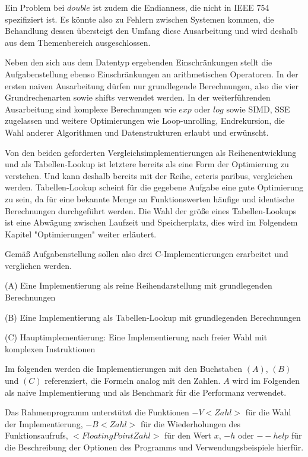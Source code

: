 \documentclass[course=erap]{aspdoc}
\begin{document}
    Ein Problem bei $double$ ist zudem die Endianness, die nicht in IEEE 754~\cite{StandardforBinaryFloating-PointArithmetic} spezifiziert ist.
    Es könnte also zu Fehlern zwischen Systemen kommen, die Behandlung dessen übersteigt den Umfang diese Ausarbeitung und wird deshalb aus dem Themenbereich ausgeschlossen.


    Neben den sich aus dem Datentyp ergebenden Einschränkungen stellt die Aufgabenstellung ebenso Einschränkungen an arithmetischen Operatoren.
    In der ersten naiven Ausarbeitung dürfen nur grundlegende Berechnungen, also die vier Grundrechenarten sowie shifts verwendet werden.
    In der weiterführenden Ausarbeitung sind komplexe Berechnungen wie $exp$ oder $log$ sowie SIMD, SSE zugelassen und weitere Optimierungen wie Loop-unrolling, Endrekursion, die Wahl anderer Algorithmen und Datenstrukturen erlaubt und erwünscht.


    Von den beiden geforderten Vergleichsimplementierungen als Reihenentwicklung und als Tabellen-Lookup ist letztere bereits als eine Form der Optimierung zu verstehen.
    Und kann deshalb bereits mit der Reihe, ceteris paribus, vergleichen werden.
    Tabellen-Lookup scheint für die gegebene Aufgabe eine gute Optimierung zu sein, da für eine bekannte Menge an Funktionswerten häufige und identische Berechnungen durchgeführt werden.
    Die Wahl der größe eines Tabellen-Lookups ist eine Abwägung zwischen Laufzeit und Speicherplatz, dies wird im Folgendem Kapitel "Optimierungen" weiter erläutert.


    Gemäß Aufgabenstellung sollen also drei C-Implementierungen erarbeitet und verglichen werden.


    (A) Eine Implementierung als reine Reihendarstellung mit grundlegenden Berechnungen


    (B) Eine Implementierung als Tabellen-Lookup mit grundlegenden Berechnungen


    (C) Hauptimplementierung: Eine Implementierung nach freier Wahl mit komplexen Instruktionen


    Im folgenden werden die Implementierungen mit den Buchstaben $(A)$, $(B)$ und $(C)$ referenziert, die Formeln analog mit den Zahlen.
    $A$ wird im Folgenden als naive Implementierung und als Benchmark für die Performanz verwendet.


    Das Rahmenprogramm unterstützt die Funktionen $-V<Zahl>$ für die Wahl der Implementierung, $-B<Zahl>$ für die Wiederholungen des Funktionsaufrufs, $<Floating Point Zahl>$ für den Wert $x$, $-h$ oder $--help$ für die Beschreibung der Optionen des Programms und Verwendungsbeispiele hierfür.
\end{document}
